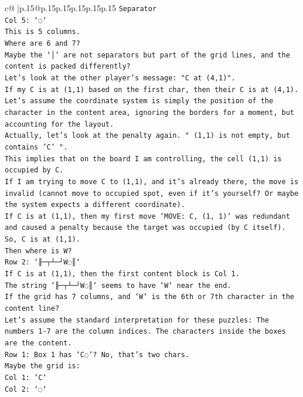\documentclass{article}
\begin{document}
{\begin{supertabular}{c@{$\;$}|p{.15\linewidth}@{}p{.15\linewidth}p{.15\linewidth}p{.15\linewidth}p{.15\linewidth}p{.15\linewidth}}
{{{\texttt{Separator} \\
\texttt{Col 5: `◌`} \\
\texttt{This is 5 columns.} \\
\texttt{Where are 6 and 7?} \\
\texttt{Maybe the `│` are not separators but part of the grid lines, and the content is packed differently?} \\
\texttt{Let's look at the other player's message: "C at (4,1)".} \\
\texttt{If my C is at (1,1) based on the first char, then their C is at (4,1).} \\
\texttt{Let's assume the coordinate system is simply the position of the character in the content area, ignoring the borders for a moment, but accounting for the layout.} \\
\texttt{Actually, let's look at the penalty again. " (1,1) is not empty, but contains 'C' ".} \\
\texttt{This implies that on the board I am controlling, the cell (1,1) is occupied by C.} \\
\texttt{If I am trying to move C to (1,1), and it's already there, the move is invalid (cannot move to occupied spot, even if it's yourself? Or maybe the system expects a different coordinate).} \\
\texttt{If C is at (1,1), then my first move `MOVE: C, (1, 1)` was redundant and caused a penalty because the target was occupied (by C itself).} \\
\texttt{So, C is at (1,1).} \\
\texttt{Then where is W?} \\
\texttt{Row 2: `╟─┬┴─┘W◌║`} \\
\texttt{If C is at (1,1), then the first content block is Col 1.} \\
\texttt{The string `╟─┬┴─┘W◌║` seems to have `W` near the end.} \\
\texttt{If the grid has 7 columns, and `W` is the 6th or 7th character in the content line?} \\
\texttt{Let's assume the standard interpretation for these puzzles: The numbers 1{-}7 are the column indices. The characters inside the boxes are the content.} \\
\texttt{Row 1: Box 1 has `C◌`? No, that's two chars.} \\
\texttt{Maybe the grid is:} \\
\texttt{Col 1: `C`} \\
\texttt{Col 2: `◌`} \\
}}}
\end{supertabular}}
\end{document}
